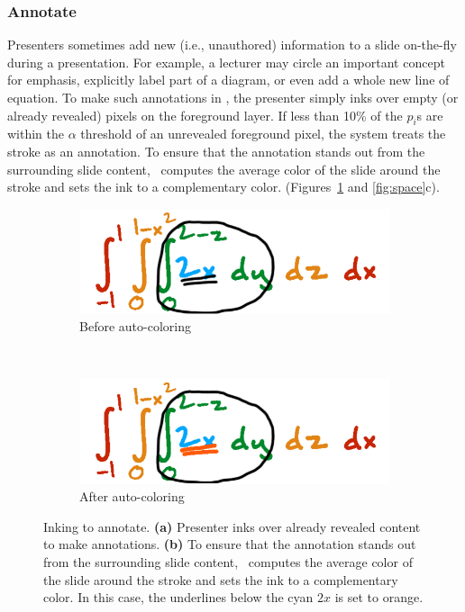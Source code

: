 \subsubsection{Annotate}
Presenters sometimes add new (i.e., unauthored) information to a slide on-the-fly during a presentation.
%
For example, a lecturer may circle an important concept for emphasis, explicitly label part of a diagram, or even add a whole new line of equation. 
%
To make such annotations in \interface, the presenter simply inks over empty (or already revealed) pixels on the foreground layer. If less than 10\% of the $p_i$s are within the $\alpha$ threshold of an unrevealed foreground pixel, the system treats the stroke as an annotation. To ensure that the annotation stands out from the surrounding slide content, \interface\ computes the average color of the slide around the stroke and sets the ink to a complementary color. (Figures~\ref{fig:annotate} and \ref{fig:space}c). 

\begin{figure}[t!]
    \centering
    \begin{subfigure}[t]{0.5\columnwidth}
        \centering
        \includegraphics[width=1\columnwidth]{figures/annotate_presenter}
        \caption{Before auto-coloring}
    \end{subfigure}%
    ~ 
    \begin{subfigure}[t]{0.5\columnwidth}
        \centering
        \includegraphics[width=1\columnwidth]{figures/annotate_audience}
        \caption{After auto-coloring}
    \end{subfigure}
      
    \caption{Inking to annotate. \textbf{(a)} Presenter inks over already revealed content to make annotations. \textbf{(b)} To ensure that the annotation stands out from the surrounding slide content, \interface\ computes the average color of the slide around the stroke and sets the ink to a complementary color. In this case, the underlines below the cyan $2x$ is set to orange.}
    \label{fig:annotate}
\end{figure}


